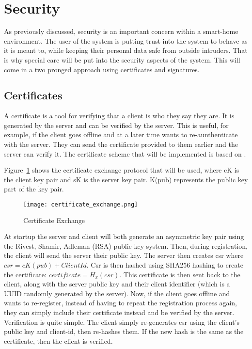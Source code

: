 \section{Security} \label{sec:chapdesign:security}
As previously discussed, security is an important concern within a smart-home environment. The user of the system is putting trust into the system to behave as it is meant to, while keeping their personal data safe from outside intruders. That is why special care will be put into the security aspects of the system. This will come in a two pronged approach using certificates and signatures. 
\subsection{Certificates}
A certificate is a tool for verifying that a client is who they say they are. It is generated by the server and can be verified by the server. This is useful, for example, if the client goes offline and at a later time wants to re-aunthenticate with the server. They can send the certificate provided to them earlier and the server can verify it. The certificate scheme that will be implemented is based on \cite{disSysConceptsDesign}.

Figure~\ref{fig:certificate_exchange} shows the certificate exchange protocol that will be used, where cK is the client key pair and sK is the server key pair. K(pub) represents the public key part of the key pair.
\begin{figure}[h]
\caption{Certificate Exchange}
\texttt{[image: certificate\_exchange.png]}
\label{fig:certificate_exchange}
\end{figure}

At startup the server and client will both generate an asymmetric key pair using the Rivest, Shamir, Adleman (RSA) public key system. Then, during registration, the client will send the server their public key. The server then creates csr where \(csr = cK(pub) + ClientId\). Csr is then hashed using SHA256 hashing to create the certificate: \(certificate = H_x(csr)\). This certificate is then sent back to the client, along with the server public key and their client identifier (which is a UUID randomly generated by the server). Now, if the client goes offline and wants to re-register, instead of having to repeat the registration process again, they can simply include their certificate instead and be verified by the server. Verification is quite simple. The client simply re-generates csr using the client's public key and client-id, then re-hashes them. If the new hash is the same as the certificate, then the client is verified.

